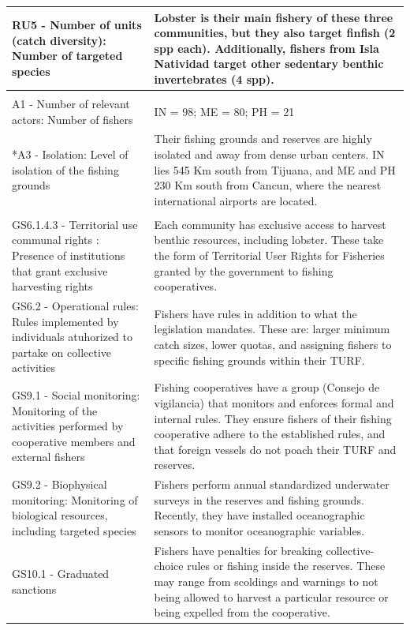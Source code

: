 \documentclass{frontiersSCNS}
\providecommand{\DIFaddendFL}{} %
\providecommand{\DIFdelbeginFL}{} %
\providecommand{\DIFdelendFL}{} %
\begin{document}
\begin{table}[H]
{\begin{tabular}[t]{>{\raggedright\arraybackslash}p{6.5cm}|>{\raggedright\arraybackslash}p{12cm}}
\hline
\hspace{1em}RU5 - Number of units (catch diversity): Number of targeted species & Lobster is their main fishery of these three communities, but they also target finfish (2 spp each). Additionally, fishers from Isla Natividad target other sedentary benthic invertebrates (4 spp).\\
\hline
\multicolumn{2}{l}{\textbf{Actors (A)}}\\
\hline
\hspace{1em}A1 - Number of relevant actors: Number of fishers & IN = 98; ME = 80; PH = 21\\
\hline
\hspace{1em}*A3 - Isolation: Level of isolation of the fishing grounds & Their fishing grounds and reserves are highly isolated and away from dense urban centers. IN lies 545 Km south from Tijuana, and ME and PH 230 Km south from Cancun, where the nearest international airports are located.\\
\hline
\multicolumn{2}{l}{\textbf{Governance system (G)}}\\
\hline
\hspace{1em}GS6.1.4.3 - Territorial use communal rights : Presence of institutions that grant exclusive harvesting rights & Each community has exclusive access to harvest benthic resources, including lobster. These take the form of Territorial User Rights for Fisheries granted by the government to fishing cooperatives.\\
\hline
\hspace{1em}GS6.2 - Operational rules: Rules implemented by individuals atuhorized to partake on collective activities & Fishers have rules in addition to what the legislation mandates. These are: larger minimum catch sizes, lower quotas, and assigning fishers to specific fishing grounds within their TURF.\\
\hline
\hspace{1em}GS9.1 - Social monitoring: Monitoring of the activities performed by cooperative members and external fishers & Fishing cooperatives have a group (Consejo de vigilancia) that monitors and enforces formal and internal rules. They ensure fishers of their fishing cooperative adhere to the established rules, and that foreign vessels do not poach their TURF and reserves.\\
\hline
\hspace{1em}GS9.2 - Biophysical monitoring: Monitoring of biological resources, including targeted species & Fishers perform annual standardized underwater surveys in the reserves and fishing grounds. Recently, they have installed oceanographic sensors to monitor oceanographic variables.\\
\hline
GS10.1 - Graduated sanctions & Fishers have penalties for breaking collective-choice rules or fishing inside the reserves. These may range from scoldings and warnings to not being allowed to harvest a particular resource or being expelled from the cooperative.\\
\hline
\end{tabular}}
\DIFdelbeginFL %
\DIFdelendFL \end{table}
\end{document}
